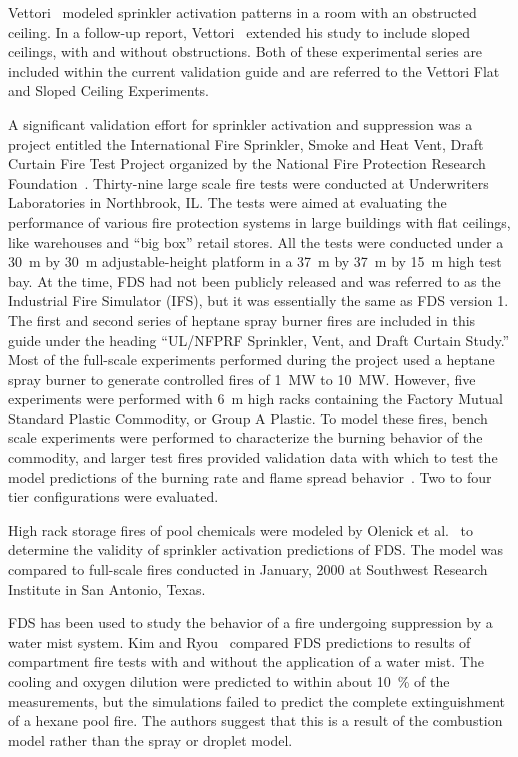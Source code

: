Vettori~\cite{Vettori:1} modeled sprinkler activation patterns in a room with an obstructed ceiling. In a follow-up report, Vettori~\cite{Vettori:2} extended his study to include sloped ceilings, with and without obstructions. Both of these experimental series are included within the current validation guide and are referred to the Vettori Flat and Sloped Ceiling Experiments.

A  significant validation effort  for sprinkler  activation and suppression was a project entitled the International Fire Sprinkler, Smoke and Heat Vent, Draft Curtain Fire Test Project organized by the National Fire Protection  Research Foundation~\cite{McGrattan:5}. Thirty-nine large scale fire tests were conducted at Underwriters Laboratories in Northbrook, IL. The tests were aimed at evaluating the performance of various fire protection systems in large buildings with flat ceilings, like warehouses and ``big box'' retail stores. All the tests were conducted under a 30~m by 30~m adjustable-height platform in a 37~m by 37~m by 15~m high test bay. At the time, FDS had not been publicly released and was referred to as the Industrial Fire Simulator (IFS), but it was essentially the same as FDS version 1. The first and second series of heptane spray burner fires are included in this guide under the heading ``UL/NFPRF Sprinkler, Vent, and Draft Curtain Study.'' Most of the full-scale experiments performed during the project used a heptane spray burner to  generate controlled fires of 1~MW to 10~MW. However, five experiments were performed with 6~m high racks containing the Factory Mutual Standard Plastic Commodity, or Group A Plastic. To model these fires, bench scale experiments were performed to characterize the burning behavior of the commodity, and larger test fires provided validation data with which to test the model predictions of the burning rate and flame spread behavior~\cite{Hamins:1,Hamins:IAFSS2002}. Two to four tier configurations were evaluated.

High rack storage fires of pool chemicals were modeled by Olenick et al.~\cite{Olenick:1} to determine the validity of sprinkler activation predictions of FDS. The model was compared to full-scale fires conducted in January, 2000 at Southwest Research Institute in San Antonio, Texas.

FDS has been used to study the behavior of a fire undergoing suppression by a water mist system. Kim and Ryou~\cite{Kim:BE2003,Kim:IJACR2004}  compared FDS  predictions to results of compartment fire tests with and without the application of a water mist. The cooling and oxygen dilution were predicted to within about 10~\% of the measurements, but the simulations failed to predict the complete extinguishment of a hexane pool fire. The authors suggest that this is a result of the combustion model rather than the spray or droplet model.


